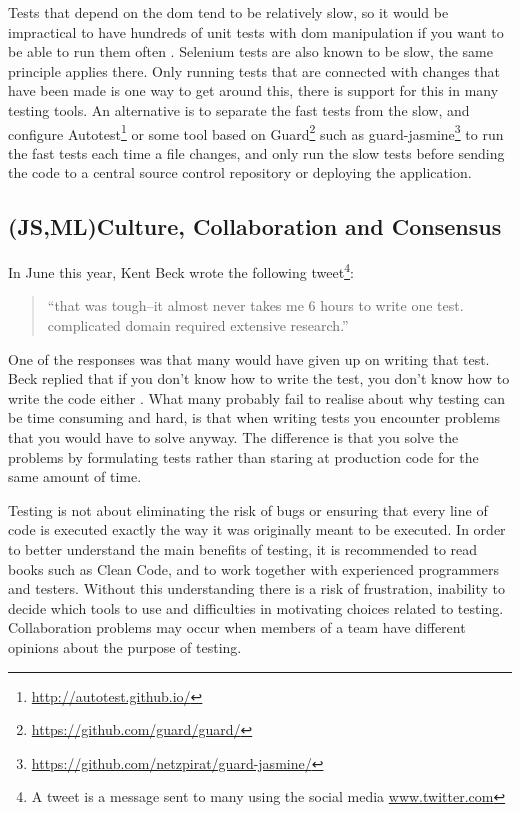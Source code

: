 \documentclass[11pt]{article}
\begin{document}
Tests that depend on the \gls{dom} tend to be relatively slow, so it would be impractical to have hundreds of unit tests with \gls{dom} manipulation if you want to be able to run them often \cite[questions~21-22]{Stenmark}. Selenium tests are also known to be slow, the same principle applies there. Only running tests that are connected with changes that have been made is one way to get around this, there is support for this in many testing tools. An alternative is to separate the fast tests from the slow, and configure Autotest\footnote{\url{http://autotest.github.io/}} or some tool based on Guard\footnote{\url{https://github.com/guard/guard/}} such as guard-jasmine\footnote{\url{https://github.com/netzpirat/guard-jasmine/}} to run the fast tests each time a file changes, and only run the slow tests before sending the code to a central source control repository or deploying the application.

\subsection{(JS,ML)Culture, Collaboration and Consensus}
\label{subsec:ccc}

In June this year, Kent Beck wrote the following tweet\footnote{A tweet is a message sent to many using the social media \url{www.twitter.com}}:

\begin{quote}
``that was tough--it almost never takes me 6 hours to write one test. complicated domain required extensive research.''
\end{quote}

One of the responses was that many would have given up on writing that test. Beck replied that if you don't know how to write the test, you don't know how to write the code either \cite{TwitterKentBeck}. What many probably fail to realise about why testing can be time consuming and hard, is that when writing tests you encounter problems that you would have to solve anyway. The difference is that you solve the problems by formulating tests rather than staring at production code for the same amount of time. \cite[question~11]{Edelstam}

Testing is not about eliminating the risk of bugs or ensuring that every line of code is executed exactly the way it was originally meant to be executed. In order to better understand the main benefits of testing, it is recommended to read books such as Clean Code\cite{Clean}, and to work together with experienced programmers and testers. Without this understanding there is a risk of frustration, inability to decide which tools to use and difficulties in motivating choices related to testing. Collaboration problems may occur when members of a team have different opinions about the purpose of testing. \cite[question~38]{Edelstam}
\end{document}
